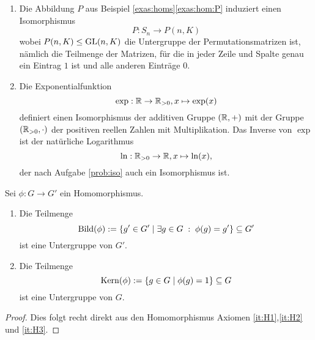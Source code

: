 \documentclass{book}
\begin{document}
\begin{exas}
    \label{exas:isos}
    \begin{enumerate}
        \item Die Abbildung $P$ aus Beispiel \ref{exas:homs}\ref{exas:hom:P} induziert einen Isomorphismus
            \[
                P: S_n \to P(n,K) 
            \]
            wobei $P(n,K) \le \operatorname{GL}(n,K)$ die Untergruppe der
            Permutationsmatrizen ist, nämlich die Teilmenge der Matrizen, für
            die in jeder Zeile und Spalte genau ein Eintrag $1$ ist und alle
            anderen Einträge $0$. 
        \item Die Exponentialfunktion 
            \[
                \exp: \mathbb{R} \to \mathbb{R}_{>0}, x \mapsto \exp(x)
            \]
            definiert einen Isomorphismus der additiven Gruppe $(\mathbb{R},+)$ mit
            der Gruppe $(\mathbb{R}_{>0},\cdot)$ der positiven reellen Zahlen mit
            Multiplikation. Das Inverse von $\exp$ ist der natürliche Logarithmus
            \[
                \ln: \mathbb{R}_{>0} \to \mathbb{R}, x \mapsto \ln(x),
            \]
            der nach Aufgabe \ref{prob:iso} auch ein Isomorphismus ist. 
    \end{enumerate}
\end{exas}

\begin{prop}
    \label{prop:kernbild}
    Sei $\phi: G \to G'$ ein Homomorphismus. 
    \begin{enumerate}
        \item Die Teilmenge 
            \[
                \Bild(\phi) := \{ g' \in G'\; |\; \exists g \in G\;:\; \phi(g) = g' \} \subset G'
            \]
            ist eine Untergruppe von $G'$.
        \item Die Teilmenge 
            \[
                \Kern(\phi) := \{ g \in G\; |\; \phi(g) = 1 \} \subset G
            \]
            ist eine Untergruppe von $G$.
    \end{enumerate}
\end{prop}
\begin{proof}
    Dies folgt recht direkt aus den Homomorphismus Axiomen \ref{it:H1},\ref{it:H2} und \ref{it:H3}.
\end{proof}
\end{document}

